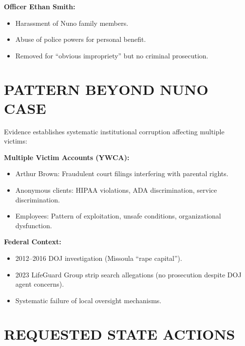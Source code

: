 \documentclass[12pt,oneside]{article}
\begin{document}
\begin{flushleft}
\textbf{Officer Ethan Smith:}

\begin{itemize}
\item Harassment of Nuno family members.
\item Abuse of police powers for personal benefit.
\item Removed for ``obvious impropriety'' but no criminal prosecution.
\end{itemize}

\section*{PATTERN BEYOND NUNO CASE}

Evidence establishes systematic institutional corruption affecting multiple victims:

\textbf{Multiple Victim Accounts (YWCA):}

\begin{itemize}
\item Arthur Brown: Fraudulent court filings interfering with parental rights.
\item Anonymous clients: HIPAA violations, ADA discrimination, service discrimination.
\item Employees: Pattern of exploitation, unsafe conditions, organizational dysfunction.
\end{itemize}

\textbf{Federal Context:}

\begin{itemize}
\item 2012--2016 DOJ investigation (Missoula ``rape capital'').
\item 2023 LifeGuard Group strip search allegations (no prosecution despite DOJ agent concerns).
\item Systematic failure of local oversight mechanisms.
\end{itemize}

\section*{REQUESTED STATE ACTIONS}


\end{flushleft}
\end{document}
